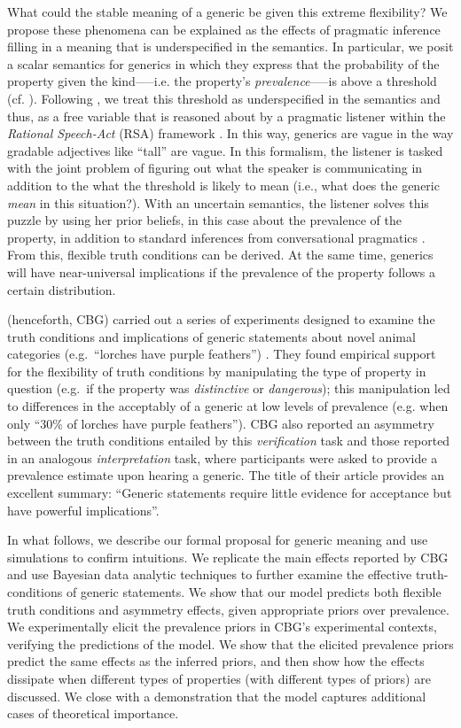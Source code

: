 \documentclass[10pt,letterpaper]{article}
\begin{document}
What could the stable meaning of a generic be given this extreme flexibility? We propose these phenomena can be explained as the effects of pragmatic inference filling in a meaning that is underspecified in the semantics. 
%
In particular, we posit a scalar semantics for generics in which they express that the probability of the property given the kind-----i.e. the property's \emph{prevalence}-----is above a threshold (cf. ). Following , we treat this threshold as underspecified in the semantics and thus, as a free variable that is reasoned about by a pragmatic listener within the \emph{Rational Speech-Act} (RSA) framework \cite{Frank2012,Goodman2013}. In this way, generics are vague in the way gradable adjectives like ``tall'' are vague. In this formalism, the listener is tasked with the joint problem of figuring out what the speaker is communicating in addition to the what the threshold is likely to mean (i.e., what does the generic \emph{mean} in this situation?). 
%
With an uncertain semantics, the listener solves this puzzle by using her prior beliefs, in this case about the prevalence of the property, in addition to standard inferences from conversational pragmatics \cite{Clark1996; Grice1975; Levinson2000}. From this, flexible truth conditions can be derived. At the same time, generics will have near-universal implications if the prevalence of the property follows a certain distribution.
%

 (henceforth, CBG) carried out a series of experiments designed to examine the truth conditions and implications of generic statements about novel animal categories (e.g.~``lorches have purple feathers'') . 
They found empirical support for the flexibility of truth conditions by manipulating the type of property in question (e.g.~if the property was \emph{distinctive} or \emph{dangerous}); this manipulation led to differences in the acceptably of a generic at low levels of prevalence (e.g. when only ``30\% of lorches have purple feathers'').
%
CBG also reported an asymmetry between the truth conditions entailed by this \emph{verification} task and those reported in an analogous \emph{interpretation} task, where participants were asked to provide a prevalence estimate upon hearing a generic. The title of their article provides an excellent summary: ``Generic statements require little evidence for acceptance but have powerful implications''.

In what follows, we describe our formal proposal for generic meaning and use simulations to confirm intuitions. We replicate the main effects reported by CBG and use Bayesian data analytic techniques to further examine the effective truth-conditions of generic statements. We show that our model predicts both flexible truth conditions and asymmetry effects, given appropriate priors over prevalence. We experimentally elicit the prevalence priors in CBG's experimental contexts, verifying the predictions of the model. We show that the elicited prevalence priors predict the same effects as the inferred priors, and then show how the effects dissipate when different types of properties (with different types of priors) are discussed. We close with a demonstration that the model captures additional cases of theoretical importance.
\end{document}
